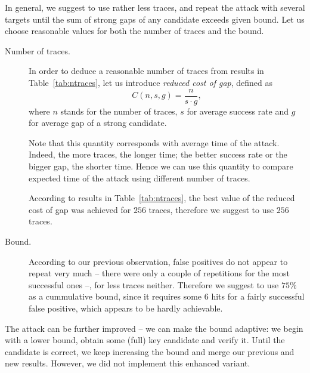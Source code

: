 In general, we suggest to use rather less traces, and repeat the attack with several targets until the sum of strong gaps of any candidate exceeds given bound. Let us choose reasonable values for both the number of traces and the bound.
\begin{description}
	\item[Number of traces.]
		In order to deduce a reasonable number of traces from results in Table~\ref{tab:ntraces}, let us introduce {\em reduced cost of gap}, defined as
		\begin{equation*}
			C(n, s, g) = \frac{n}{s\cdot g} ,
		\end{equation*}
		where $n$ stands for the number of traces, $s$ for average success rate and $g$ for average gap of a strong candidate.
		
		Note that this quantity corresponds with average time of the attack. Indeed, the more traces, the longer time; the better success rate or the bigger gap, the shorter time. Hence we can use this quantity to compare expected time of the attack using different number of traces.
		
		According to results in Table~\ref{tab:ntraces}, the best value of the reduced cost of gap was achieved for $256$ traces, therefore we suggest to use $256$ traces.
	\item[Bound.]
		According to our previous observation, false positives do not appear to repeat very much -- there were only a couple of repetitions for the most successful ones --, for less traces neither. Therefore we suggest to use $75\%$ as a cummulative bound, since it requires some $6$ hits for a fairly successful false positive, which appears to be hardly achievable.
\end{description}

\begin{remark}
\label{rem:attimpr}
	The attack can be further improved -- we can make the bound adaptive: we begin with a lower bound, obtain some (full) key candidate and verify it. Until the candidate is correct, we keep increasing the bound and merge our previous and new results. However, we did not implement this enhanced variant.
\end{remark}

